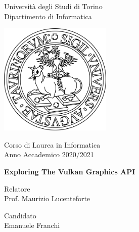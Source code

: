 \begin{titlepage}

    \centering
    \vspace*{1.0cm}

    \Huge
    Università degli Studi di Torino\\
    \LARGE
    Dipartimento di Informatica

    \vspace{0.7cm}

    \includegraphics[width=0.4\textwidth]{images/Title/UnitoLogo.png}

    \vspace{0.5cm}

    \LARGE
    Corso di Laurea in Informatica\\
    Anno Accademico 2020/2021

    \vspace{2.0cm}

    \Huge
    \textbf{Exploring The Vulkan Graphics API}

    \vfill

    \flushleft
    \LARGE
    Relatore\\
    Prof. Maurizio Lucenteforte

    \vspace{0.5cm}
    \flushright
    \LARGE
    Candidato\\
    Emanuele Franchi

\end{titlepage}
